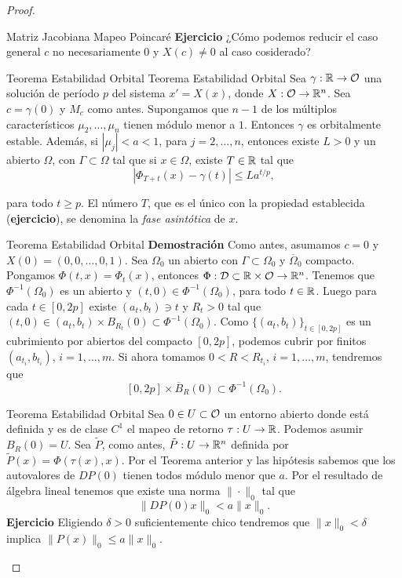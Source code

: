 \begin{proof}
\begin{ejemplo}
{Matriz Jacobiana Mapeo Poincaré}
\textbf{Ejercicio} ¿Cómo podemos reducir el caso general $c$ no necesariamente $0$ y $X(c)\neq 0$ al caso cosiderado? 



{Teorema Estabilidad Orbital}
{Teorema Estabilidad Orbital} 
 Sea $\gamma:\mathbb{R}\to\mathcal{O}$ una solución de período $p$ del sistema $x'=X(x)$, donde $X:\mathcal{O}\to \mathbb{R}^n$. Sea $c=\gamma(0)$ y $M_c$ como antes. Supongamos que $n-1$ de los múltiplos 
 característicos $\mu_2,\ldots,\mu_n$ tienen módulo menor a $1$. Entonces $\gamma$ es orbitalmente estable. Además, si $|\mu_j|<a<1$, para $j=2,\ldots,n$, entonces 
 existe $L>0$ y un abierto $\Omega$, con $\Gamma\subset\Omega$ tal que si $x\in\Omega$, existe $T\in\mathbb{R}$ tal que
 \begin{equation}\label{est_asi}
  |\Phi_{T+t}(x)-\gamma(t)|\leq La^{t/p},
 \end{equation}

 para todo $t\geq p$. El número $T$, que es  el único con la propiedad establecida (\textbf{ejercicio}), se denomina la \emph{fase asintótica} de $x$.
 






{Teorema Estabilidad Orbital}
\textbf{Demostración} Como antes, asumamos $c=0$ y $X(0)=(0,0,\ldots,0,1)$. Sea $\Omega_0$ un abierto con $\Gamma\subset\Omega_0$ y $\overline{\Omega}_0$ compacto. Pongamos
$\Phi(t,x)=\Phi_t(x)$, entonces $\Phi:\mathcal{D}\subset\mathbb{R}\times \mathcal{O}\to\mathbb{R}^n$. Tenemos que $\Phi^{-1}(\Omega_0)$ es un abierto y $(t,0)\in\Phi^{-1}(\Omega_0)$, para todo 
$t\in\mathbb{R}$. Luego para cada $t\in[0,2p]$ existe $(a_t,b_t)\ni t$ y $R_t>0$ tal que $(t,0)\in(a_t,b_t)\times B_{R_t}(0)\subset\Phi^{-1}(\Omega_0)$. Como $\{(a_t,b_t)\}_{t\in[0,2p]}$
es un cubrimiento por abiertos del compacto $[0,2p]$, podemos cubrir por finitos $(a_{t_i},b_{t_i})$, $i=1,\ldots,m$. Si ahora tomamos $0<R< R_{t_i}$, $i=1,\ldots,m$, 
tendremos que
\[[0,2p]\times\overline{B}_{R}(0)\subset\Phi^{-1}(\Omega_0).\]





{Teorema Estabilidad Orbital}
Sea $0\in U\subset\mathcal{O}$ un entorno abierto donde está definida y es de clase $C^1$ el mapeo de retorno $\tau:U\to\mathbb{R}$. Podemos asumir $B_R(0)= U$. Sea $\tilde{P}$, como antes, 
$\tilde{P}:U\to\mathbb{R}^n$ definida por $\tilde{P}(x)=\Phi(\tau(x),x)$. Por el Teorema anterior y las hipótesis sabemos que los autovalores de $DP(0)$ tienen todos módulo menor que
$a$. Por el resultado de álgebra lineal tenemos que existe una norma $\|\cdot\|_0$ tal que
\[\|DP(0)x\|_0<a\|x\|_0.\]
\textbf{Ejercicio} Eligiendo $\delta>0$ suficientemente chico tendremos que  $\|x\|_0<\delta$ implica $\|P(x)\|_0\leq a\|x\|_0$. 


\end{ejemplo}
\end{proof}
